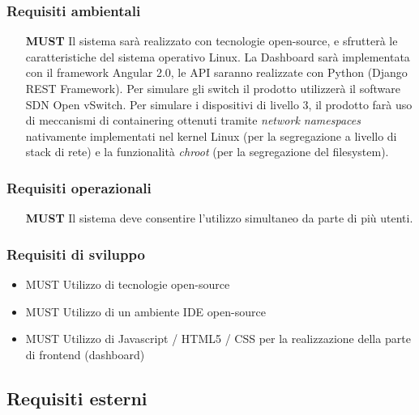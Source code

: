 \documentclass[../main.tex]{subfiles}
\begin{document}
\subsubsection{Requisiti  ambientali}
\begin{itemize}
    \item[\textbf{MUST}] Il sistema sarà realizzato con tecnologie open-source, e sfrutterà le caratteristiche del sistema operativo Linux. La Dashboard sarà implementata con il framework Angular 2.0, le API saranno realizzate con Python (Django REST Framework). Per simulare gli switch il prodotto utilizzerà il software SDN Open vSwitch. Per simulare i dispositivi di livello 3, il prodotto farà uso di meccanismi di containering ottenuti tramite \textit{network namespaces} nativamente implementati nel kernel Linux (per la segregazione a livello di stack di rete) e la funzionalità \textit{chroot} (per la segregazione del filesystem).
\end{itemize}
\subsubsection{Requisiti  operazionali}
\begin{itemize}
    \item[\textbf{MUST}] Il sistema deve consentire l'utilizzo simultaneo da parte di più utenti.
\end{itemize}
\subsubsection{Requisiti di sviluppo}
\begin{itemize}
    \item{MUST} Utilizzo di tecnologie open-source
    \item{MUST} Utilizzo di un ambiente IDE open-source
    \item{MUST} Utilizzo di Javascript / HTML5 / CSS per la realizzazione della parte di frontend (dashboard)
\end{itemize}
\subsection{Requisiti esterni}
\begin {itemize}
\end {itemize}
\end{document}
